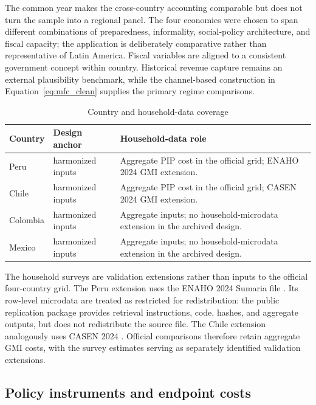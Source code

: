The common year makes the cross-country accounting comparable but does not turn the sample into a regional panel. The four economies were chosen to span different combinations of preparedness, informality, social-policy architecture, and fiscal capacity; the application is deliberately comparative rather than representative of Latin America. Fiscal variables are aligned to a consistent government concept within country. Historical revenue capture remains an external plausibility benchmark, while the channel-based construction in Equation~\eqref{eq:mfc_clean} supplies the primary regime comparisons.

\begin{table}[H]
\centering
\small
\caption{Country and household-data coverage}
\label{tab:country_data_clean}
\begin{tabular}{@{}l>{\raggedright\arraybackslash}p{}>{\raggedright\arraybackslash}p{}@{}}
\toprule
Country & Design anchor & Household-data role \\
\midrule
Peru & 2024 harmonized inputs & Aggregate PIP cost in the official grid; ENAHO 2024 GMI extension. \\
Chile & 2024 harmonized inputs & Aggregate PIP cost in the official grid; CASEN 2024 GMI extension. \\
Colombia & 2024 harmonized inputs & Aggregate inputs; no household-microdata extension in the archived design. \\
Mexico & 2024 harmonized inputs & Aggregate inputs; no household-microdata extension in the archived design. \\
\bottomrule
\end{tabular}
\end{table}

The household surveys are validation extensions rather than inputs to the official four-country grid. The Peru extension uses the ENAHO 2024 Sumaria file \citep{inei2024enaho}. Its row-level microdata are treated as restricted for redistribution: the public replication package provides retrieval instructions, code, hashes, and aggregate outputs, but does not redistribute the source file. The Chile extension analogously uses CASEN 2024 \citep{mdsf2024casen}. Official comparisons therefore retain aggregate GMI costs, with the survey estimates serving as separately identified validation extensions.

\subsection{Policy instruments and endpoint costs}\label{subsec:policy_costs_clean}

